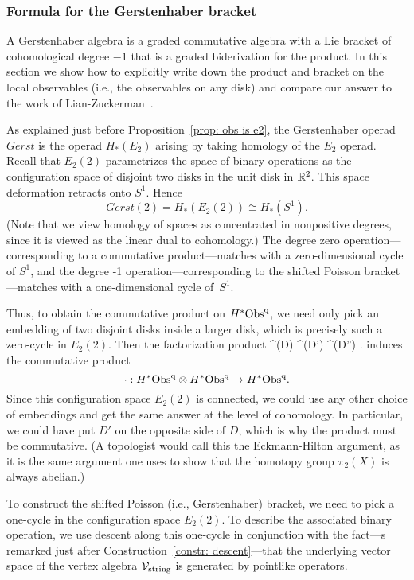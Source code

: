 \subsubsection{Formula for the Gerstenhaber bracket}

A Gerstenhaber algebra is a graded commutative algebra with a Lie bracket of cohomological degree $-1$ that is a graded biderivation for the product. 
In this section we show how to explicitly write down the product and bracket on the local observables (i.e., the observables on any disk) and compare our answer to the work of Lian-Zuckerman~\cite{LZ1}.

As explained just before Proposition~\ref{prop: obs is e2}, 
the Gerstenhaber operad $Gerst$ is the operad $H_*(E_2)$ arising by taking homology of the $E_2$ operad.
Recall that $E_2(2)$ parametrizes the space of binary operations as the configuration space of disjoint two disks in the unit disk in $\mathbb R^2$.
This space deformation retracts onto $S^1$.
Hence 
\[
Gerst(2) = H_*(E_2(2)) \cong H_*(S^1). 
\]
(Note that we view homology of spaces as concentrated in nonpositive degrees,
since it is viewed as the linear dual to cohomology.)
The degree zero operation---corresponding to a commutative product---matches with a zero-dimensional cycle of $S^1$,
and the degree -1 operation---corresponding to the shifted Poisson bracket---matches with a one-dimensional cycle of~$S^1$. 

Thus, to obtain the commutative product on $H^*{\rm Obs}^{\rm q}$, 
we need only pick an embedding of two disjoint disks inside a larger disk,
which is precisely such a zero-cycle in $E_2(2)$.
Then the factorization product
\ben
\Obs^\q(D) \tensor \Obs^\q(D') \to \Obs^\q(D'') .
\een 
induces the commutative product
\[
\cdot: H^*{\rm Obs}^{\rm q} \otimes H^*{\rm Obs}^{\rm q} \to H^*{\rm Obs}^{\rm q}.
\]
Since this configuration space $E_2(2)$ is connected, 
we could use any other choice of embeddings and get the same answer at the level of cohomology.
In particular, we could have put $D'$ on the opposite side of $D$,
which is why the product must be commutative.
(A topologist would call this the Eckmann-Hilton argument,
as it is the same argument one uses to show that the homotopy group $\pi_2(X)$ is always abelian.)

To construct the shifted Poisson (i.e., Gerstenhaber) bracket, 
we need to pick a one-cycle in the configuration space $E_2(2)$.
To describe the associated binary operation, 
we use descent along this one-cycle
in conjunction with the fact---s remarked just after Construction~\ref{constr: descent}---that
the underlying vector space of the vertex algebra $\mathcal{V}_{\rm string}$ is generated by pointlike operators.

